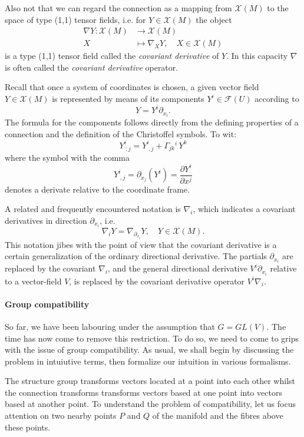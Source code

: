 \documentclass[12pt]{article}
\newcommand{\vs}{\mathcal{X}}
\newcommand{\fs}{\mathcal{F}}
\newcommand{\cvf}[1]{\partial_{x_{#1}}}
\begin{document}
Also not that we can regard the connection as a mapping from $\vs(M)$
to the space of type (1,1) tensor fields, i.e. for $Y\in\vs(M)$ the
object 
\begin{align*}
\nabla Y: \vs(M)& \rightarrow \vs(M)\\
X &\mapsto \nabla_{\!X} Y,\quad X\in \vs(M)  
\end{align*}
is a type
(1,1) tensor field called the {\em covariant derivative} of $Y$.  In
this capacity $\nabla$ is often called the {\em covariant derivative}
operator. 


Recall that once a system of coordinates is chosen,
a given vector field $Y\in \vs(M)$ is represented by means of its
components $Y^i\in\fs(U)$ according to
$$Y = Y^i \cvf{i}.$$   
The formula for the
components follows directly from the defining properties of a
connection and the definition of the Christoffel symbols.  To wit:
$$Y^i_{\; ;j} = Y^i_{\; ,j} +  \Gamma_{jk}{}^i\, Y^k$$
where the symbol with the comma 
$$Y^i_{\; ,j} = \cvf{j}(Y^i) = \frac{\partial Y^i}{\partial x^j}$$
denotes a derivate relative to the coordinate frame.

A related and frequently encountered notation is $\nabla_i$, which 
indicates a covariant derivatives in direction $\cvf{i}$, i.e.
$$\nabla_i Y = \nabla_{\! \cvf{i}} Y,\quad Y\in\vs(M).$$
This notation
jibes with the point of view that the covariant derivative is a
certain generalization of the ordinary directional derivative.  The
partials $\cvf{i}$ are replaced by the covariant
$\nabla_i$, and the general directional derivative
$V^i\cvf{i}$ relative to a vector-field $V$, is
replaced by the covariant derivative operator $V^i \nabla_i.$

\paragraph{Group compatibility}
So far, we have been labouring under the assumption that $G = GL(V)$.  The time has now come to remove this restriction.  To do so, we need to come to grips with the issue of group compatibility.  As usual, we shall begin by discussing the problem in intuiutive terms, then formalize our intuition in various formalisms.

The structure group transforms vectors located at a point into each other whilst the connection transforms transforms vectors based at one point into vectors based at another point.  To understand the problem of compatibility, let us focus attention on two nearby points $P$ and $Q$ of the manifold and the fibres above these points.
\end{document}
